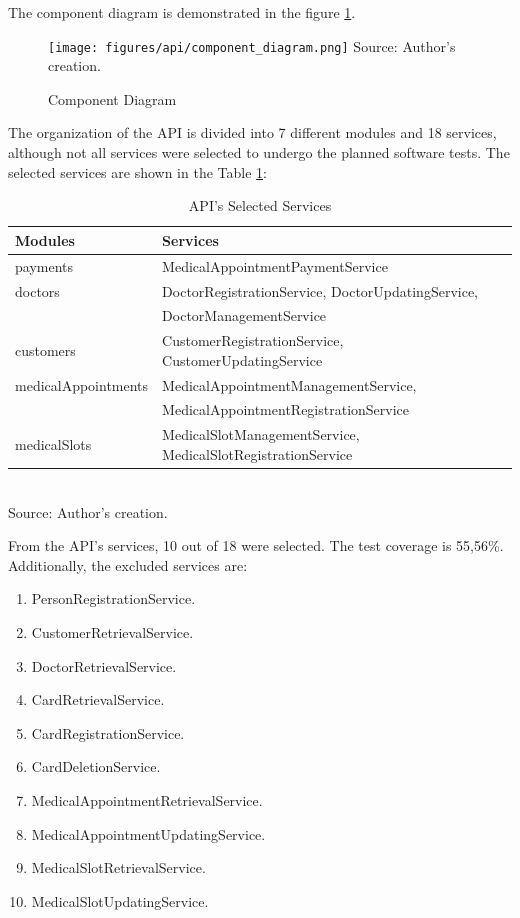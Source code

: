 The component diagram is demonstrated in the figure \ref{fig:component_diagram}.

\begin{figure}[H]
	\centering
	\caption{Component Diagram}
	\texttt{[image: figures/api/component\_diagram.png]}
	\label{fig:component_diagram}
	\footnotesize Source: Author's creation.
\end{figure}

The organization of the API is divided into 7 different modules and 18 services, although not all services were selected to undergo the planned software tests. The selected services are shown in the Table \ref{tab:selected_services}:

\begin{table}[H]
	\centering
	\caption{API's Selected Services}
	\label{tab:selected_services}
	\begin{tabular}{ll}
		\textbf{Modules} & \textbf{Services} \\ \hline
		payments & MedicalAppointmentPaymentService \\ \hline
		doctors & DoctorRegistrationService, DoctorUpdatingService, \\
		& DoctorManagementService \\ \hline
		customers & CustomerRegistrationService, CustomerUpdatingService \\ \hline
		medicalAppointments & MedicalAppointmentManagementService, \\
		& MedicalAppointmentRegistrationService \\ \hline
		medicalSlots & MedicalSlotManagementService, MedicalSlotRegistrationService \\ \hline
	\end{tabular}
	\\ \footnotesize Source: Author's creation.
\end{table}

From the API's services, 10 out of 18 were selected. The test coverage is 55,56\%. Additionally, the excluded services are:

\begin{enumerate}
    \item PersonRegistrationService.
    \item CustomerRetrievalService.
    \item DoctorRetrievalService.
    \item CardRetrievalService.
    \item CardRegistrationService.
    \item CardDeletionService.
    \item MedicalAppointmentRetrievalService.
    \item MedicalAppointmentUpdatingService.
    \item MedicalSlotRetrievalService.
    \item MedicalSlotUpdatingService.
\end{enumerate}

